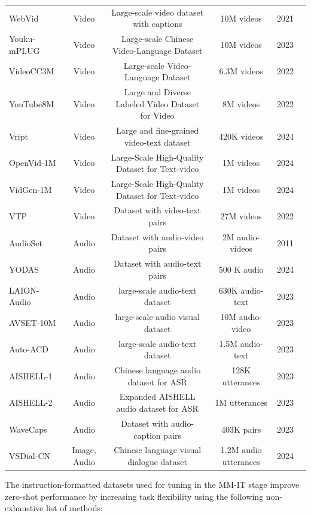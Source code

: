 \documentclass[runningheads]{llncs}
\begin{document}
\begin{table}[htb]
{\begin{tabular}{l c c c c c}
    			WebVid & Video & Large-scale video dataset with captions & 10M videos & 2021\\
                    Youku-mPLUG  & Video & Large-scale Chinese Video-Language Dataset & 10M videos & 2023\\
                    VideoCC3M & Video & Large-scale Video-Language Dataset & 6.3M videos & 2022\\
                    YouTube8M & Video & Large and Diverse Labeled Video Dataset for Video & 8M videos & 2022\\
                    Vript & Video & Large and fine-grained video-text dataset  & 420K videos & 2024\\
                    OpenVid-1M  & Video & Large-Scale High-Quality Dataset for Text-video  & 1M videos & 2024\\
                    VidGen-1M  & Video & Large-Scale High-Quality Dataset for Text-video  & 1M videos & 2024\\
    			VTP & Video & Dataset with video-text pairs & 27M videos & 2022\\
                    AudioSet  & Audio & Dataset with audio-video pairs & 2M audio-videos & 2011\\
                    YODAS  & Audio & Dataset with audio-text pairs & 500 K audio & 2024\\
                    LAION-Audio  & Audio & large-scale audio-text dataset  & 630K audio-text & 2023\\
                    AVSET-10M & Audio & large-scale audio visual dataset  & 10M audio-video & 2023\\
                    Auto-ACD  & Audio & large-scale audio-text dataset  & 1.5M audio-text & 2023\\
    			AISHELL-1 & Audio & Chinese language audio dataset for ASR & 128K utterances & 2023\\
    			AISHELL-2 & Audio & Expanded AISHELL audio dataset for ASR & 1M utterances & 2023\\
    			WaveCaps & Audio & Dataset with audio-caption pairs & 403K pairs & 2023\\
    			VSDial-CN & Image, Audio & Chinese language visual dialogue dataset & 1.2M audio utterances & 2024\\
    			
    	\end{tabular}}
    
    \end{table}

The instruction-formatted datasets used for tuning in the MM-IT stage improve zero-shot performance by increasing task flexibility using the following non-exhaustive list of methods:
\end{document}
